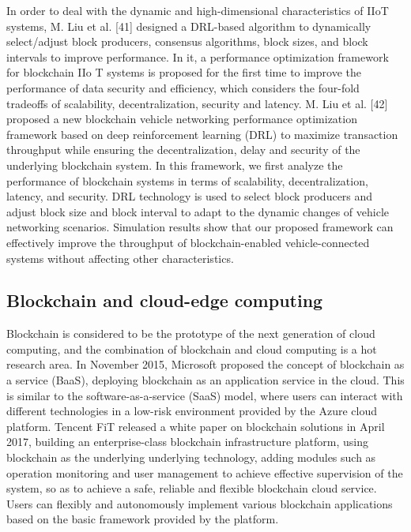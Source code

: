 \documentclass[lettersize,journal]{IEEEtran}
\begin{document}
In order to deal with the dynamic and high-dimensional characteristics of IIoT systems, M. Liu et al. [41] designed a DRL-based algorithm to dynamically select/adjust block producers, consensus algorithms, block sizes, and block intervals to improve performance. In it, a performance optimization framework for blockchain IIo T systems is proposed for the first time to improve the performance of data security and efficiency, which considers the four-fold tradeoffs of scalability, decentralization, security and latency. M. Liu et al. [42] proposed a new blockchain vehicle networking performance optimization framework based on deep reinforcement learning (DRL) to maximize transaction throughput while ensuring the decentralization, delay and security of the underlying blockchain system. In this framework, we first analyze the performance of blockchain systems in terms of scalability, decentralization, latency, and security. DRL technology is used to select block producers and adjust block size and block interval to adapt to the dynamic changes of vehicle networking scenarios. Simulation results show that our proposed framework can effectively improve the throughput of blockchain-enabled vehicle-connected systems without affecting other characteristics.
\subsection{Blockchain and cloud-edge computing}
Blockchain is considered to be the prototype of the next generation of cloud computing, and the combination of blockchain and cloud computing is a hot research area. In November 2015, Microsoft proposed the concept of blockchain as a service (BaaS), deploying blockchain as an application service in the cloud. This is similar to the software-as-a-service (SaaS) model, where users can interact with different technologies in a low-risk environment provided by the Azure cloud platform. Tencent FiT released a white paper on blockchain solutions in April 2017, building an enterprise-class blockchain infrastructure platform, using blockchain as the underlying underlying technology, adding modules such as operation monitoring and user management to achieve effective supervision of the system, so as to achieve a safe, reliable and flexible blockchain cloud service. Users can flexibly and autonomously implement various blockchain applications based on the basic framework provided by the platform.
\end{document}
